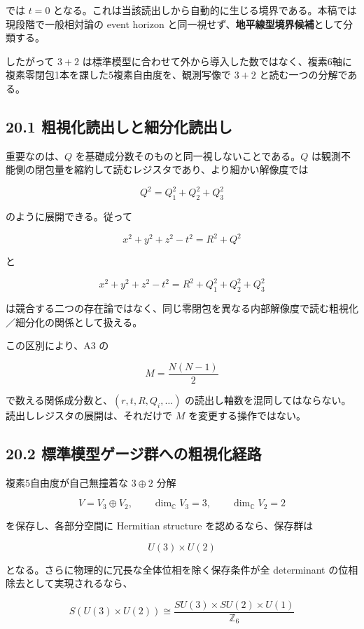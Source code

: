 \documentclass[
  a4paper,
]{ltjsarticle}
\begin{document}
では \(t=0\)
となる。これは当該読出しから自動的に生じる境界である。本稿では現段階で一般相対論の
event horizon と同一視せず、\textbf{地平線型境界候補}として分類する。

したがって \(3+2\)
は標準模型に合わせて外から導入した数ではなく、複素6軸に複素零閉包1本を課した5複素自由度を、観測写像で
\(3+2\) と読む一つの分解である。

\subsection{20.1
粗視化読出しと細分化読出し}\label{ux7c97ux8996ux5316ux8aadux51faux3057ux3068ux7d30ux5206ux5316ux8aadux51faux3057}

重要なのは、\(Q\) を基礎成分数そのものと同一視しないことである。\(Q\)
は観測不能側の閉包量を縮約して読むレジスタであり、より細かい解像度では

\[
\boxed{Q^2=Q_1^2+Q_2^2+Q_3^2}
\]

のように展開できる。従って

\[
x^2+y^2+z^2-t^2=R^2+Q^2
\]

と

\[
\boxed{x^2+y^2+z^2-t^2=R^2+Q_1^2+Q_2^2+Q_3^2}
\]

は競合する二つの存在論ではなく、同じ零閉包を異なる内部解像度で読む粗視化／細分化の関係として扱える。

この区別により、A3 の

\[
M=\frac{N(N-1)}2
\]

で数える関係成分数と、\((r,t,R,Q_i,\ldots)\)
の読出し軸数を混同してはならない。読出しレジスタの展開は、それだけで
\(M\) を変更する操作ではない。

\subsection{20.2
標準模型ゲージ群への粗視化経路}\label{ux6a19ux6e96ux6a21ux578bux30b2ux30fcux30b8ux7fa4ux3078ux306eux7c97ux8996ux5316ux7d4cux8def}

複素5自由度が自己無撞着な \(3\oplus2\) 分解

\[
V=V_3\oplus V_2,
\qquad
\dim_{\mathbb C}V_3=3,
\qquad
\dim_{\mathbb C}V_2=2
\]

を保存し、各部分空間に Hermitian structure を認めるなら、保存群は

\[
U(3)\times U(2)
\]

となる。さらに物理的に冗長な全体位相を除く保存条件が全 determinant
の位相除去として実現されるなら、

\[
\boxed{
S(U(3)\times U(2))
\cong
\frac{SU(3)\times SU(2)\times U(1)}{\mathbb Z_6}
}
\]
\end{document}
